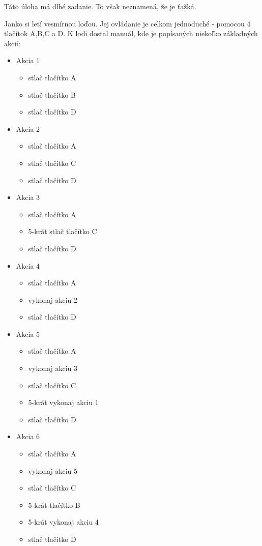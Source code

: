 




Táto úloha má dlhé zadanie. To však neznamená, že je ťažká.

Janko si letí vesmírnou loďou. Jej ovládanie je celkom jednoduché - pomocou 4 tlačítok A,B,C a D. K lodi dostal manuál, kde je popísaných niekoľko základných akcií:

\begin{itemize}
	\item Akcia 1
	\begin{itemize}
		\item stlač tlačítko A
		\item stlač tlačítko B
		\item stlač tlačítko D
	\end{itemize}

	\item Akcia 2
	\begin{itemize}
		\item stlač tlačítko A
		\item stlač tlačítko C
		\item stlač tlačítko D
	\end{itemize}

	\item Akcia 3
	\begin{itemize}
		\item stlač tlačítko A
		\item 5-krát stlač tlačítko C
		\item stlač tlačítko D
	\end{itemize}

	\item Akcia 4
	\begin{itemize}
		\item stlač tlačítko A
		\item vykonaj akciu 2
		\item stlač tlačítko D
	\end{itemize}

	\item Akcia 5
	\begin{itemize}
		\item stlač tlačítko A
		\item vykonaj akciu 3
		\item stlač tlačítko C
		\item 5-krát vykonaj akciu 1
		\item stlač tlačítko D
	\end{itemize}

	\item Akcia 6
	\begin{itemize}
		\item stlač tlačítko A
		\item vykonaj akciu 5
		\item stlač tlačítko C
		\item 5-krát tlačítko B
		\item 5-krát vykonaj akciu 4
		\item stlač tlačítko D
	\end{itemize}

\end{itemize}
